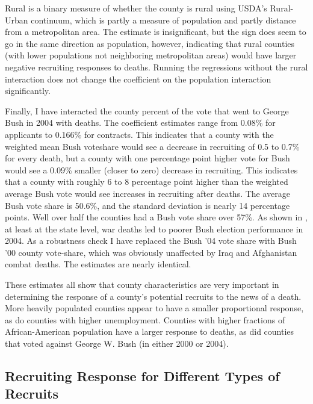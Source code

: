 \documentclass[12pt] {article}
\begin{document}
Rural is a binary measure of whether the county is rural using USDA's Rural-Urban continuum, which is partly a measure of population and partly distance from a metropolitan area. The estimate is insignificant, but the sign does seem to go in the same direction as population, however, indicating that rural counties
(with lower populations not neighboring metropolitan areas) would have larger negative recruiting responses
to deaths. Running the regressions without the rural interaction does
not change the coefficient on the population interaction significantly.

Finally, I have interacted the county percent of the vote that went
to George Bush in 2004 with deaths. The coefficient estimates range
from 0.08\% for applicants to 0.166\% for contracts. This indicates
that a county with the weighted mean Bush voteshare would see a decrease
in recruiting of 0.5 to 0.7\% for every death, but a county with one
percentage point higher vote for Bush would see a 0.09\% smaller (closer
to zero) decrease in recruiting. This indicates that a county with
roughly 6 to 8 percentage point higher than the weighted average Bush
vote would see increases in recruiting after deaths. The average Bush
vote share is 50.6\%, and the standard deviation is nearly 14 percentage
points. Well over half the counties had a Bush vote share over 57\%.
As shown in \cite{Ted-Miguel-Bush-Deaths}, at least at the state
level, war deaths led to poorer Bush election performance in 2004.
As a robustness check I have replaced the Bush '04 vote share with
Bush '00 county vote-share, which was obviously unaffected by Iraq
and Afghanistan combat deaths. The estimates are nearly identical. 

These estimates all show that county characteristics are very important
in determining the response of a county's potential recruits to the
news of a death. More heavily populated counties appear to have a
smaller proportional response, as do counties with higher unemployment.
Counties with higher fractions of African-American population have
a larger response to deaths, as did counties that voted against George
W. Bush (in either 2000 or 2004).



\subsection{Recruiting Response for Different Types of Recruits \label{sub:Different Recruit Types}}
\end{document}
